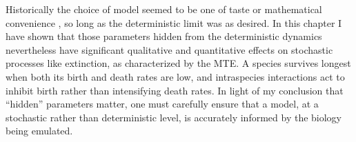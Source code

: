 Historically the choice of model seemed to be one of taste or mathematical convenience \cite{Greenhalgh1990,Ovaskainen2010,Assaf2010,Allen2003a,Norden1982,Newman2004,Allen2005,Nasell2001}, so long as the deterministic limit was as desired. %
In this chapter I have shown that those parameters hidden from the deterministic dynamics nevertheless have significant qualitative and quantitative effects on stochastic processes like extinction, as characterized by the MTE. 
A species survives longest when both its birth and death rates are low, and intraspecies interactions act to inhibit birth rather than intensifying death rates. 
In light of my conclusion that ``hidden'' parameters matter, one must carefully ensure that a model, at a stochastic rather than deterministic level, is accurately informed by the biology being emulated. 






